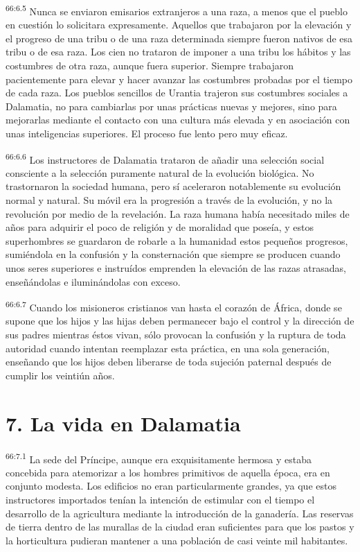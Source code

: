 \par
\textsuperscript{66:6.5} Nunca se enviaron emisarios extranjeros a una raza, a menos que el pueblo en cuestión lo solicitara expresamente. Aquellos que trabajaron por la elevación y el progreso de una tribu o de una raza determinada siempre fueron nativos de esa tribu o de esa raza. Los cien no trataron de imponer a una tribu los hábitos y las costumbres de otra raza, aunque fuera superior. Siempre trabajaron pacientemente para elevar y hacer avanzar las costumbres probadas por el tiempo de cada raza. Los pueblos sencillos de Urantia trajeron sus costumbres sociales a Dalamatia, no para cambiarlas por unas prácticas nuevas y mejores, sino para mejorarlas mediante el contacto con una cultura más elevada y en asociación con unas inteligencias superiores. El proceso fue lento pero muy eficaz.

\par
\textsuperscript{66:6.6} Los instructores de Dalamatia trataron de añadir una selección social consciente a la selección puramente natural de la evolución biológica. No trastornaron la sociedad humana, pero sí aceleraron notablemente su evolución normal y natural. Su móvil era la progresión a través de la evolución, y no la revolución por medio de la revelación. La raza humana había necesitado miles de años para adquirir el poco de religión y de moralidad que poseía, y estos superhombres se guardaron de robarle a la humanidad estos pequeños progresos, sumiéndola en la confusión y la consternación que siempre se producen cuando unos seres superiores e instruídos emprenden la elevación de las razas atrasadas, enseñándolas e iluminándolas con exceso.

\par
\textsuperscript{66:6.7} Cuando los misioneros cristianos van hasta el corazón de África, donde se supone que los hijos y las hijas deben permanecer bajo el control y la dirección de sus padres mientras éstos vivan, sólo provocan la confusión y la ruptura de toda autoridad cuando intentan reemplazar esta práctica, en una sola generación, enseñando que los hijos deben liberarse de toda sujeción paternal después de cumplir los veintiún años.

\section*{7. La vida en Dalamatia}
\par
\textsuperscript{66:7.1} La sede del Príncipe, aunque era exquisitamente hermosa y estaba concebida para atemorizar a los hombres primitivos de aquella época, era en conjunto modesta. Los edificios no eran particularmente grandes, ya que estos instructores importados tenían la intención de estimular con el tiempo el desarrollo de la agricultura mediante la introducción de la ganadería. Las reservas de tierra dentro de las murallas de la ciudad eran suficientes para que los pastos y la horticultura pudieran mantener a una población de casi veinte mil habitantes.


